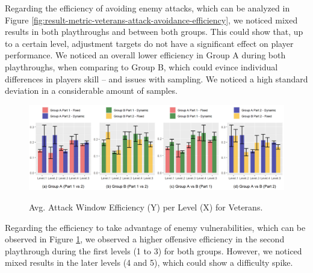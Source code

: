 Regarding the efficiency of avoiding enemy attacks, which can be analyzed in Figure \ref{fig:result-metric-veterans-attack-avoidance-efficiency}, we noticed mixed results in both playthroughs and between both groups. This could show that, up to a certain level, adjustment targets do not have a significant effect on player performance. We noticed an overall lower efficiency in Group A during both playthroughs, when comparing to Group B, which could evince individual differences in players skill -- and issues with sampling. We noticed a high standard deviation in a considerable amount of samples.

\begin{figure}[!ht]
    \begin{center}
    \caption{Avg. Attack Window Efficiency (Y) per Level (X) for Veterans.}
        \includegraphics[width=\textwidth]{figures/attack_window_efficiency-veteran_players.png}
    \label{fig:result-metric-veterans-attack-window-efficiency}
    \end{center}
\end{figure}

Regarding the efficiency to take advantage of enemy vulnerabilities, which can be observed in Figure \ref{fig:result-metric-veterans-attack-window-efficiency}, we observed a higher offensive efficiency in the second playthrough during the first levels (1 to 3) for both groups. However, we noticed mixed results in the later levels (4 and 5), which could show a difficulty spike.

